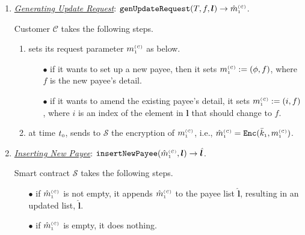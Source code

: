 \begin{enumerate}[leftmargin=.46cm]
\item\label{genUpdateRequest}  {\underline{\textit{Generating  Update Request}}: $\mathtt{genUpdateRequest}(T, f, {\bm l})\rightarrow \hat m^{\scriptscriptstyle\mathcal{(C)}}_{\scriptscriptstyle 1}$}.

Customer $\mathcal{C}$ takes the following steps. 

\begin{enumerate}
%
\item sets its request parameter $m_{\scriptscriptstyle 1}^{\scriptscriptstyle(\mathcal C)}$ as below. 
%
\begin{itemize}

\item[$\bullet$] if it wants to set up a new payee, then it sets $m_{\scriptscriptstyle 1}^{\scriptscriptstyle(\mathcal C)}:=(\phi,f)$, where $f$ is the new payee's detail.  %

%
\item[$\bullet$] if it wants to amend the existing payee's detail,   it sets $m_{\scriptscriptstyle 1}^{\scriptscriptstyle(\mathcal C)}:=(i, f)$, where $i$ is an index of the element in $\bm l$ that should  change to $f$.  %



\end{itemize}
\item\label{send-update-req} at time $t_{\scriptscriptstyle 0}$, sends to $\mathcal{S}$  the encryption of $m_{\scriptscriptstyle 1}^{\scriptscriptstyle(\mathcal C)}$, i.e., $\hat m_{\scriptscriptstyle 1}^{\scriptscriptstyle(\mathcal C)}=\mathtt{Enc}(\bar k_{\scriptscriptstyle 1}, m_{\scriptscriptstyle 1}^{\scriptscriptstyle(\mathcal C)})$. 
\end{enumerate}
%

 \item \underline{\textit{Inserting New Payee}}: $\mathtt{insertNewPayee}(\hat m^{\scriptscriptstyle\mathcal{(C)}}_{\scriptscriptstyle 1}, {\bm l})\rightarrow {\hat{\bm l}}$.
 
Smart contract $\mathcal{S}$ takes the following steps. 
 \begin{itemize}
 \item[$\bullet$] if $\hat m_{\scriptscriptstyle 1}^{\scriptscriptstyle(\mathcal C)}$  is not empty, it appends $\hat m_{\scriptscriptstyle 1}^{\scriptscriptstyle(\mathcal C)}$ to the payee list $\hat{\bm l}$, resulting in an updated list, $\hat{\bm l}$. 
  \item[$\bullet$] if $\hat m_{\scriptscriptstyle 1}^{\scriptscriptstyle(\mathcal C)}$ is empty,  it does nothing. 
 \end{itemize}
 

\end{enumerate}
